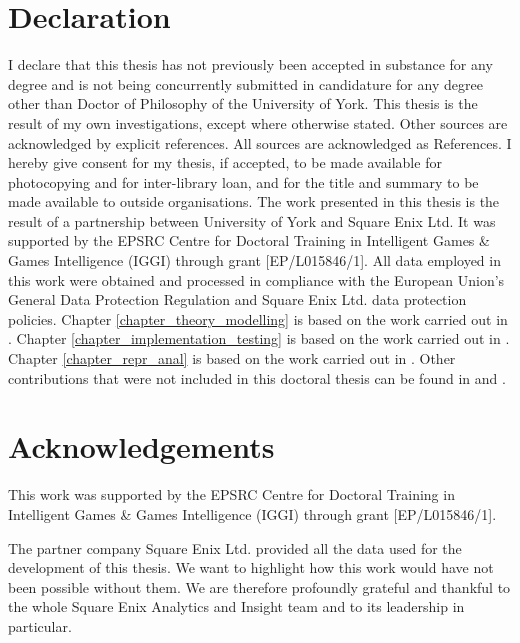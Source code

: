 \documentclass{yorkThesis}
\begin{document}
\chapter*{Declaration}
\label{declaration}
 I declare that this thesis has not previously been accepted in substance for any degree and is not being concurrently submitted in candidature for any degree other than Doctor of Philosophy of the University of York. This thesis is the result of my own investigations, except where otherwise stated. Other sources are acknowledged by explicit references. All sources are acknowledged as References. I hereby give consent for my thesis, if accepted, to be made available for photocopying and for inter-library loan, and for the title and summary to be made available to outside organisations. The work presented in this thesis is the result of a partnership between University of York and Square Enix Ltd. It was supported by the EPSRC Centre for Doctoral Training in Intelligent Games \& Games Intelligence (IGGI) through grant [EP/L015846/1]. All data employed in this work were obtained and processed in compliance with the European Union's General Data Protection Regulation \cite{EUdataregulations2018} and Square Enix Ltd. data protection policies. Chapter \ref{chapter_theory_modelling} is based on the work carried out in \cite{bonometti2020theory, bonometti2021approximating}. Chapter \ref{chapter_implementation_testing} is based on the work carried out in \cite{bonometti2019modelling, bonometti2020theory, bonometti2021approximating}. Chapter \ref{chapter_repr_anal} is based on the work carried out in \cite{bonometti2021approximating}. Other contributions that were not included in this doctoral thesis can be found in \cite{aung2018predicting} and \cite{vardal2022mind}.

\chapter*{Acknowledgements}
\label{acknowledgements}
This work was supported by the EPSRC Centre for Doctoral Training in Intelligent Games \& Games Intelligence (IGGI) through grant [EP/L015846/1]. 

The partner company Square Enix Ltd. provided all the data used for the development of this thesis. We want to highlight how this work would have not been possible without them. We are therefore profoundly grateful and thankful to the whole Square Enix Analytics and Insight team and to its leadership in particular.
\end{document}

